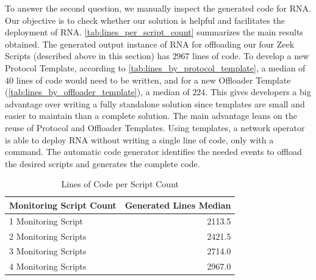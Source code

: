 To answer the second question, we manually inspect the generated code for RNA. Our objective is to check whether our solution is helpful and facilitates the deployment of RNA. \autoref{tab:lines_per_script_count} summarizes the main results obtained. The generated output instance of RNA for offloading our four Zeek Scripts (described above in this section) has $2967$ lines of code. To develop a new Protocol Template, according to \autoref{tab:lines_by_protocol_template}, a median of $40$ lines of code would need to be written, and for a new Offloader Template (\autoref{tab:lines_by_offloader_template}), a median of $224$. This gives developers a big advantage over writing a fully standalone solution since templates are small and easier to maintain than a complete solution. The main advantage leans on the reuse of Protocol and Offloader Templates. Using templates, a network operator is able to deploy RNA without writing a single line of code, only with a command. The automatic code generator identifies the needed events to offload the desired scripts and generates the complete code.


\begin{table}[htb]
    \caption{Lines of Code per Script Count}
    \begin{center}
        \begin{tabular}{|l|r|}
            \hline
            \textbf{Monitoring Script Count} & \multicolumn{1}{l|}{\textbf{Generated Lines Median}} \\ \hline
            1 Monitoring Script              & 2113.5                                             \\ \hline
            2 Monitoring Scripts             & 2421.5                                             \\ \hline
            3 Monitoring Scripts             & 2714.0                                             \\ \hline
            4 Monitoring Scripts             & 2967.0                                             \\ \hline
        \end{tabular}%
    \end{center}
    \label{tab:lines_per_script_count}
\end{table}

